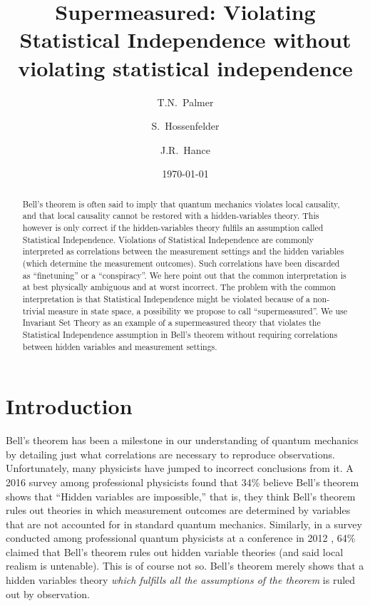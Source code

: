 \documentclass[12pt,superscriptaddress]{revtex4-2}
\begin{document}
\title{Supermeasured: Violating Statistical Independence without violating statistical independence}
\author{T.N.\ Palmer}
\author{S.\ Hossenfelder}
\author{J.R.\ Hance}
\date{\today}

\begin{abstract}
Bell's theorem is often said to imply that quantum mechanics violates local causality, and that local causality cannot be restored with a hidden-variables theory. This however is only correct if the hidden-variables theory fulfils an assumption called Statistical Independence. Violations of Statistical Independence are commonly interpreted as correlations between the measurement settings and the hidden variables (which determine the measurement outcomes). Such correlations have been discarded as ``finetuning'' or a ``conspiracy''. We here point out that the common interpretation is at best physically ambiguous and at worst incorrect. The problem with the common interpretation is that Statistical Independence might be violated because of a non-trivial measure in state space, a possibility we propose to call ``supermeasured''. We use Invariant Set Theory as an example of a supermeasured theory that violates the Statistical Independence assumption in Bell's theorem without requiring correlations between hidden variables and measurement settings. 
\end{abstract}

\maketitle

\newpage

\section{Introduction}
\label{intro}
Bell's theorem \cite{Bell1964OnEPR} has been a milestone in our understanding of quantum mechanics by detailing just what correlations are necessary to reproduce observations. Unfortunately, many physicists have jumped to incorrect conclusions from it. A 2016 survey among professional physicists \cite{Sujeevan2016Survey} found that 34\% believe Bell's theorem shows that ``Hidden variables are impossible,'' that is, they think Bell's theorem rules out theories in which measurement outcomes are determined by variables that are not accounted for in standard quantum mechanics. Similarly, in a survey conducted among professional quantum physicists at a conference in 2012 \cite{Schlosshauer2013Attitudes}, 64\% claimed that Bell's theorem rules out hidden variable theories (and said local realism is untenable). This is of course not so. Bell's theorem merely shows that a hidden variables theory {\emph{which fulfills all the assumptions of the theorem}} is ruled out by observation.
\end{document}
